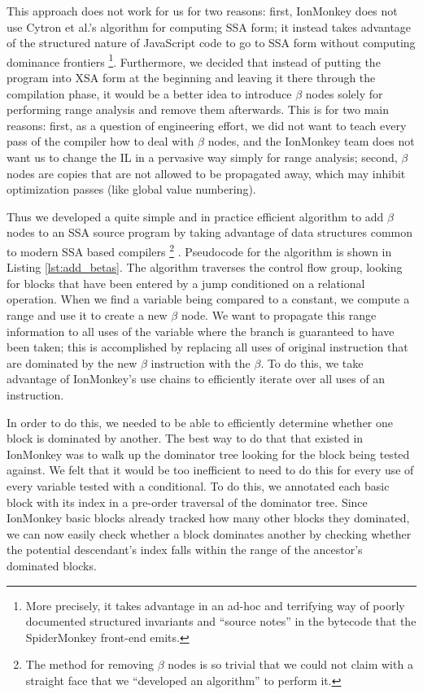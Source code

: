 \documentclass{article}
\begin{document}
This approach does not work for us for two reasons: first, IonMonkey
does not use Cytron et al.'s algorithm for computing SSA form; it
instead takes advantage of the structured nature of JavaScript code to
go to SSA form without computing dominance frontiers \footnote{More
  precisely, it takes advantage in an ad-hoc and terrifying way of
  poorly documented structured invariants and ``source notes'' in the
  bytecode that the SpiderMonkey front-end emits.}.  Furthermore, we
decided that instead of putting the program into XSA form at the
beginning and leaving it there through the compilation phase, it would
be a better idea to introduce $\beta$ nodes solely for performing
range analysis and remove them afterwards. This is for two main
reasons: first, as a question of engineering effort, we did not want
to teach every pass of the compiler how to deal with $\beta$ nodes,
and the IonMonkey team does not want us to change the IL in a pervasive
way simply for range analysis; second, $\beta$ nodes are copies that
are not allowed to be propagated away, which may inhibit optimization
passes (like global value numbering).

Thus we developed a quite simple and in practice efficient algorithm to
add $\beta$ nodes to an SSA source program by taking
advantage of data structures common to modern SSA based compilers
\footnote{The method for removing $\beta$ nodes is so trivial that we
  could not claim with a straight face that we ``developed an
  algorithm'' to perform it.} .  Pseudocode for the algorithm is shown
in Listing \ref{lst:add_betas}. The algorithm traverses the control
flow group, looking for blocks that have been entered by a jump
conditioned on a relational operation. When we find a variable being
compared to a constant, we compute a range and use it to create a new
$\beta$ node. We want to propagate this range information to all uses
of the variable where the branch is guaranteed to have been taken;
this is accomplished by replacing all uses of original instruction
that are dominated by the new $\beta$ instruction with the $\beta$. To
do this, we take advantage of IonMonkey's use chains to efficiently
iterate over all uses of an instruction.

In order to do this, we needed to be able to efficiently determine
whether one block is dominated by another. The best way to do that
that existed in IonMonkey was to walk up the dominator tree looking
for the block being tested against. We felt that it would be too
inefficient to need to do this for every use of every variable tested
with a conditional. To do this, we annotated each basic block with its
index in a pre-order traversal of the dominator tree. Since IonMonkey
basic blocks already tracked how many other blocks they dominated, we
can now easily check whether a block dominates another by checking
whether the potential descendant's index falls within the range of the
ancestor's dominated blocks.
\end{document}
